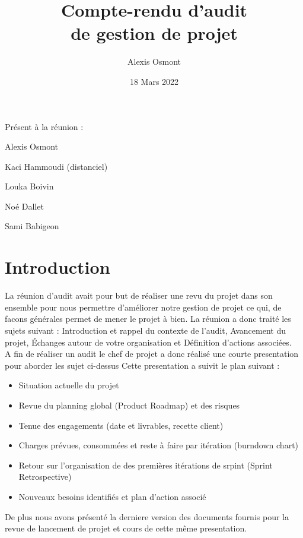\documentclass{article}
\title{
    \Huge
    Compte-rendu d'audit\\
    de gestion de projet\\
}
\date{\huge 18 Mars 2022}
\author{\huge Alexis Osmont\\}
\begin{document}
\maketitle
\vspace{5cm}
    Présent à la réunion :
    \begin{description}
        \item Alexis Osmont
        \item Kaci Hammoudi (distanciel)
        \item Louka Boivin
        \item Noé Dallet
        \item Sami Babigeon
    \end{description}
\newpage

\section{Introduction}   

La réunion d'audit avait pour but de réaliser une revu du projet dans son ensemble pour nous permettre 
d'améliorer notre gestion de projet ce qui, de facons générales permet de mener le projet à bien. La réunion
a donc traité les sujets suivant : 
Introduction et rappel du contexte de l’audit,
Avancement du projet,
Échanges autour de votre organisation et 
Définition d’actions associées.\\
\newline
A fin de réaliser un audit le chef de projet a donc réalisé une courte presentation pour aborder les sujet ci-dessus
Cette presentation a suivit le plan suivant :
\begin{itemize}
    \item Situation actuelle du projet
    \item Revue du planning global (Product Roadmap) et des risques
    \item Tenue des engagements (date et livrables, recette client)
    \item Charges prévues, consommées et reste à faire par itération (burndown chart)
    \item Retour sur l’organisation de des premières itérations de srpint (Sprint Retrospective)
    \item Nouveaux besoins identifiés et plan d’action associé\newline
\end{itemize}

De plus nous avons présenté la derniere version des documents fournis pour la revue de lancement de projet et cours 
de cette même presentation.
\end{document}
